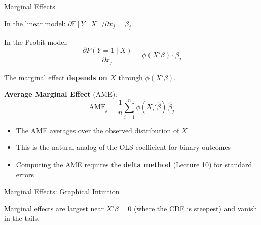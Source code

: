 \documentclass[aspectratio=169, handout, t]{beamer}
\numberwithin{equation}{section}
\begin{document}
\begin{frame}{Marginal Effects}

In the linear model: $\partial \mathbb{E}[Y \mid X]/\partial x_j = \beta_j$.

\pause

In the Probit model:
\[
\frac{\partial P(Y=1 \mid X)}{\partial x_j}
=
\phi(X'\beta) \cdot \beta_j
\]

\pause

The marginal effect \textbf{depends on $X$} through $\phi(X'\beta)$.

\pause

\bigskip

\textbf{Average Marginal Effect} (AME):
\[
\widehat{\text{AME}}_j = \frac{1}{n}\sum_{i=1}^n \phi(X_i'\hat\beta)\,\hat\beta_j
\]

\pause

\begin{itemize}
    \item The AME averages over the observed distribution of $X$
    \item This is the natural analog of the OLS coefficient for binary outcomes
    \item Computing the AME requires the \textbf{delta method} (Lecture 10) for standard errors
\end{itemize}

\end{frame}


\begin{frame}{Marginal Effects: Graphical Intuition}

\begin{center}
\end{center}

\pause

Marginal effects are largest near $X'\beta = 0$ (where the CDF is steepest) and vanish in the tails.

\end{frame}
\end{document}
